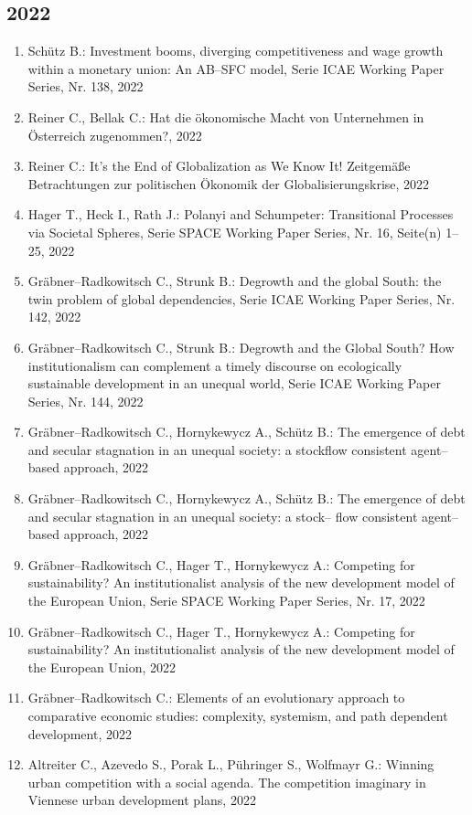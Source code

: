 \subsection*{2022}
\begin{enumerate}
    	 \item Schütz B.: Investment booms, diverging competitiveness and wage growth within a monetary union: An AB--SFC model, Serie ICAE Working Paper Series, Nr. 138, 2022
	 \item Reiner C., Bellak C.: Hat die ökonomische Macht von Unternehmen in Österreich zugenommen?, 2022
	 \item Reiner C.: It’s the End of Globalization as We Know It! Zeitgemäße Betrachtungen zur politischen Ökonomik der Globalisierungskrise, 2022
	 \item Hager T., Heck I., Rath J.: Polanyi and Schumpeter: Transitional Processes via Societal Spheres, Serie SPACE Working Paper Series, Nr. 16, Seite(n) 1--25, 2022
	 \item Gräbner--Radkowitsch C., Strunk B.: Degrowth and the global South: the twin problem of global dependencies, Serie ICAE Working Paper Series, Nr. 142, 2022
	 \item Gräbner--Radkowitsch C., Strunk B.: Degrowth and the Global South? How institutionalism can complement a timely discourse on ecologically sustainable development in an unequal world, Serie ICAE Working Paper Series, Nr. 144, 2022
	 \item Gräbner--Radkowitsch C., Hornykewycz A., Schütz B.: The emergence of debt and secular stagnation in an unequal society: a stockflow consistent agent--based approach, 2022
	 \item Gräbner--Radkowitsch C., Hornykewycz A., Schütz B.: The emergence of debt and secular stagnation in an unequal society: a stock-- flow consistent agent--based approach, 2022
	 \item Gräbner--Radkowitsch C., Hager T., Hornykewycz A.: Competing for sustainability? An institutionalist analysis of the new development model of the European Union, Serie SPACE Working Paper Series, Nr. 17, 2022
	 \item Gräbner--Radkowitsch C., Hager T., Hornykewycz A.: Competing for sustainability? An institutionalist analysis of the new development model of the European Union, 2022
	 \item Gräbner--Radkowitsch C.: Elements of an evolutionary approach to comparative economic studies: complexity, systemism, and path dependent development, 2022
	 \item Altreiter C., Azevedo S., Porak L., Pühringer S., Wolfmayr G.: Winning urban competition with a social agenda. The competition imaginary in Viennese urban development plans, 2022

\end{enumerate}

